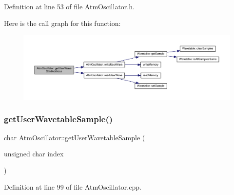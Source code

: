 Definition at line 53 of file Atm\+Oscillator.\+h.

Here is the call graph for this function\+:
\nopagebreak
\begin{figure}[H]
\begin{center}
\leavevmode
\includegraphics[width=350pt]{class_atm_oscillator_a19bdaa400d57eeb24ca027febc2fd1cf_cgraph}
\end{center}
\end{figure}
\mbox{\label{class_atm_oscillator_ae5ef1556ef77dbf9ecceb5b64a1ad7e8}} 
\subsubsection{\texorpdfstring{get\+User\+Wavetable\+Sample()}{getUserWavetableSample()}}
{\footnotesize\ttfamily char Atm\+Oscillator\+::get\+User\+Wavetable\+Sample (\begin{DoxyParamCaption}\item[{unsigned char}]{index }\end{DoxyParamCaption})}



Definition at line 99 of file Atm\+Oscillator.\+cpp.


